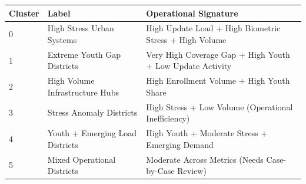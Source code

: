 \begin{tabular}{l l p{8cm}}
\toprule
Cluster & Label & Operational Signature \\
\midrule
0 & High Stress Urban Systems & High Update Load + High Biometric Stress + High Volume \\
1 & Extreme Youth Gap Districts & Very High Coverage Gap + High Youth + Low Update Activity \\
2 & High Volume Infrastructure Hubs & High Enrollment Volume + High Youth Share \\
3 & Stress Anomaly Districts & High Stress + Low Volume (Operational Inefficiency) \\
4 & Youth + Emerging Load Districts & High Youth + Moderate Stress + Emerging Demand \\
5 & Mixed Operational Districts & Moderate Across Metrics (Needs Case-by-Case Review) \\
\bottomrule
\end{tabular}
